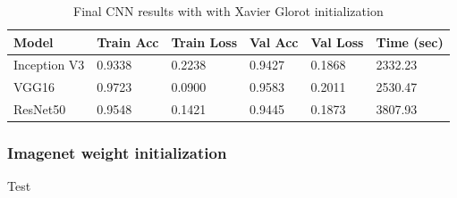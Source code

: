 \documentclass{article}
\theoremstyle{definition}
\theoremstyle{remark}
\begin{document}
\begin{table}[h!]
\center
\begin{tabular}{|l|l|l|l|l|l|}
\hline
\textbf{Model} & \textbf{Train Acc} & \textbf{Train Loss} & \textbf{Val Acc} & \textbf{Val Loss} & \textbf{Time (sec)}\\ \hline
Inception V3	& 0.9338 & 0.2238  & 0.9427	& 0.1868 &	2332.23\\ \hline
VGG16  		& 0.9723   & 0.0900   & 0.9583	&	0.2011 &  2530.47\\ \hline
ResNet50  	& 0.9548  & 0.1421 	& 0.9445 &	0.1873	 &  3807.93\\ \hline
\end{tabular}
\caption{Final CNN results with with Xavier Glorot initialization}
\label{tab:final_cnn_results_xavier}
\end{table}




\subsubsection{Imagenet weight initialization}

Test
\end{document}

